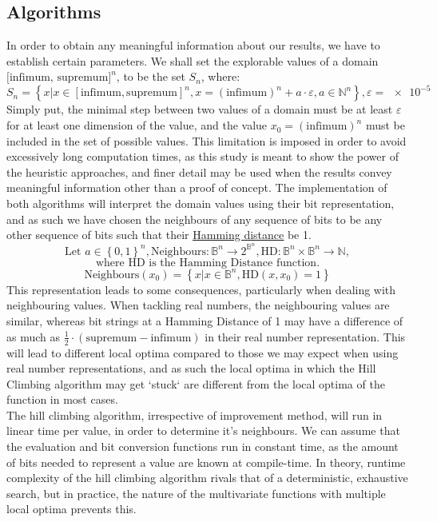 \documentclass{article}
\begin{document}
\subsection{Algorithms}
In order to obtain any meaningful information about our results, we have to establish certain parameters. We shall set the explorable values of a domain $\text{[infimum, supremum]}^n$, to be the set $S_n$, where:
$$ S_n = \left\{ x | x \in [\text{infimum}, \text{supremum}]^n, x = (\text{infimum})^n + a \cdot \varepsilon, a \in \mathbb{N}^n \right\}, \varepsilon = \num{e-5} $$
Simply put, the minimal step between two values of a domain must be at least $\varepsilon$ for at least one dimension of the value, and the value $ x_0 = (\text{infimum})^n $ must be included in the set of possible values. This limitation is imposed in order to avoid excessively long computation times, as this study is meant to show the power of the heuristic approaches, and finer detail may be used when the results convey meaningful information other than a proof of concept.
The implementation of both algorithms will interpret the domain values using their bit representation, and as such we have chosen the neighbours of any sequence of bits to be any other sequence of bits such that their \underline{\href{https://en.wikipedia.org/wiki/Hamming_distance}{Hamming distance}}\cite{HD} be 1.
$$ \text{Let } a \in \left\{0, 1\right\}^n,
\text{Neighbours} \colon \mathbb{B}^n \to 2^{\mathbb{B}^n},
\text{HD}:\mathbb{B}^n \times \mathbb{B}^n \to \mathbb{N},$$ $$\text{where HD is the Hamming Distance function.}$$
$$ \text{Neighbours}\left(x_0\right) = \left\{x | x \in \mathbb{B}^n, \text{HD}\left(x, x_0\right) = 1  \right\} $$
This representation leads to some consequences, particularly when dealing with neighbouring values. When tackling real numbers, the neighbouring values are similar, whereas bit strings at a Hamming Distance of 1 may have a difference of as much as $ \frac{1}{2}\cdot\left(\text{supremum} - \text{infimum}\right)$ in their real number representation. This will lead to different local optima compared to those we may expect when using real number representations, and as such the local optima in which the Hill Climbing algorithm may get `stuck` are different from the local optima of the function in most cases. \\
The hill climbing algorithm, irrespective of improvement method, will run in linear time per value, in order to determine it's neighbours. We can assume that the evaluation and bit conversion functions run in constant time, as the amount of bits needed to represent a value are known at compile-time. In theory, runtime complexity of the hill climbing algorithm rivals that of a deterministic, exhaustive search, but in practice, the nature of the multivariate functions with multiple local optima prevents this. 
\end{document}
